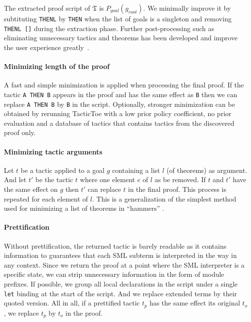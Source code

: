 \documentclass[runningheads,a4paper,draft]{svjour3}
\def\sml{\textsf{SML}\xspace}
\def\tactictoe{\textsf{TacticToe}\xspace}
\begin{document}
The extracted proof script of $\mathfrak{T}$ is $P_{goal}(g_{root})$.
We minimally improve it by subtituting \texttt{THENL} by \texttt{THEN} when the 
list of goals is a singleton and removing \texttt{THENL []} during the 
extraction phase.
Further post-processing such as
eliminating unnecessary tactics and theorems has been developed and
improve the user experience greatly~\cite{DBLP:conf/sefm/Adams15}.

\paragraph{Minimizing length of the proof} 
A fast and simple minimization is applied when processing the final proof. If 
the tactic \texttt{A THEN B} appears in the proof and has the same effect as 
\texttt{B} then we can replace \texttt{A THEN B} by \texttt{B} in the script.
Optionally, stronger minimization can be obtained 
by rerunning \tactictoe with a low prior 
policy coefficient, no prior evaluation and a database of tactics that contains 
tactics from the discovered proof only. 

\paragraph{Minimizing tactic arguments}
Let $t$ be a tactic applied to a goal $g$ containing a list $l$ (of theorems) 
as argument. And let $t'$ be the tactic $t$ where one element $e$ of $l$ as be 
removed. If $t$ and $t'$ have the same effect on $g$ then $t'$ can replace $t$ 
in the final proof. This process is repeated for each element of $l$.
This is a generalization of the simplest method used for minimizing a list of 
theorems in ``hammers'' \cite{hammers4qed}.

\paragraph{Prettification}
Without prettification, the returned tactic is barely readable as it contains 
information to guarantees that each \sml subterm is interpreted in the way in 
any context. Since we return the proof at a point where the \sml interpreter is 
a specific state, we can strip unnecessary information in the form of 
module prefixes. If possible, we group all local declarations in the 
script under a single \texttt{let} binding at the start of the script. And we 
replace extended terms by their quoted version.
All in all, if a prettified tactic $t_p$ has the same effect its original 
$t_o$, we replace $t_p$ by $t_o$ in the proof.\\
\end{document}
